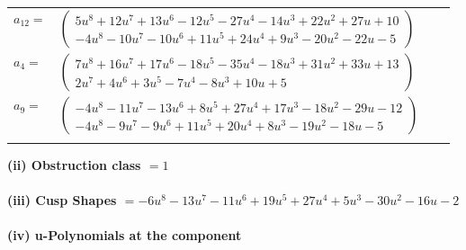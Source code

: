 \documentclass[1p]{elsarticle_modified}
\theoremstyle{definition}
\begin{document}
\begin{tabular}{m{7pt} m{180pt} m{7pt} m{180pt} }
\flushright $a_{12}=$&$\begin{pmatrix}5 u^8+12 u^7+13 u^6-12 u^5-27 u^4-14 u^3+22 u^2+27 u+10\\-4 u^8-10 u^7-10 u^6+11 u^5+24 u^4+9 u^3-20 u^2-22 u-5\end{pmatrix}$ \\
\flushright $a_{4}=$&$\begin{pmatrix}7 u^8+16 u^7+17 u^6-18 u^5-35 u^4-18 u^3+31 u^2+33 u+13\\2 u^7+4 u^6+3 u^5-7 u^4-8 u^3+10 u+5\end{pmatrix}$ \\
\flushright $a_{9}=$&$\begin{pmatrix}-4 u^8-11 u^7-13 u^6+8 u^5+27 u^4+17 u^3-18 u^2-29 u-12\\-4 u^8-9 u^7-9 u^6+11 u^5+20 u^4+8 u^3-19 u^2-18 u-5\end{pmatrix}$\\&\end{tabular}
\flushleft \textbf{(ii) Obstruction class $= 1$}\\~\\
\flushleft \textbf{(iii) Cusp Shapes $= -6 u^8-13 u^7-11 u^6+19 u^5+27 u^4+5 u^3-30 u^2-16 u-2$}\\~\\
\newpage\renewcommand{\arraystretch}{1}
\flushleft \textbf{(iv) u-Polynomials at the component}\newline \\
\end{document}
